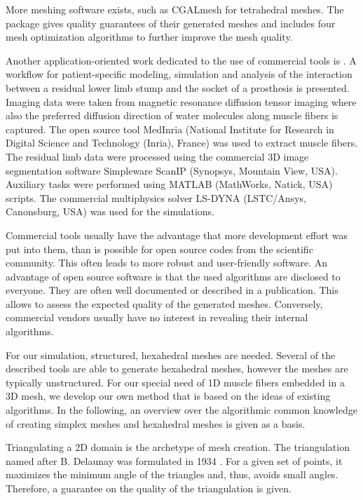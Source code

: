 More meshing software exists, such as CGALmesh \cite{Jamin2015CGALmesh} for tetrahedral meshes. The package gives quality guarantees of their generated meshes and includes four mesh optimization algorithms to further improve the mesh quality.

Another application-oriented work dedicated to the use of commercial tools is \cite{Ellankavi2018}. A workflow for patient-specific modeling, simulation and analysis of the interaction between a residual lower limb stump and the socket of a prosthesis is presented. Imaging data were taken from magnetic resonance diffusion tensor imaging where also the preferred diffusion direction of water molecules along muscle fibers is captured. The open source tool MedInria (National Institute for Research in Digital Science and Technology (Inria), France) \cite{vichot2012cardiac} was used to extract muscle fibers. The residual limb data were processed using the commercial 3D image segmentation software Simpleware ScanIP (Synopsys, Mountain View, USA). Auxiliary tasks were performed using MATLAB (MathWorks,	Natick, USA) scripts. The commercial multiphysics solver LS-DYNA (LSTC/Ansys, Canonsburg, USA) was used for the simulations.

Commercial tools usually have the advantage that more development effort was put into them, than is possible for open source codes from the scientific community. This often leads to more robust and user-friendly software. An advantage of open source software is that the used algorithms are disclosed to everyone. They are often well documented or described in a publication. This allows to assess the expected quality of the generated meshes. Conversely, commercial vendors usually have no interest in revealing their internal algorithms.

For our simulation, structured, hexahedral meshes are needed. Several of the described tools are able to generate hexahedral meshes, however the meshes are typically unstructured. For our special need of 1D muscle fibers embedded in a 3D mesh, we develop our own method that is based on the ideas of existing algorithms. In the following, an overview over the algorithmic common knowledge of creating simplex meshes and hexahedral meshes is given as a basis.

Triangulating a 2D domain is the archetype of mesh creation. The triangulation named after B. Delaunay was formulated in 1934 \cite{delaunay1934sphere}. For a given set of points, it maximizes the minimum angle of the triangles and, thus, avoids small angles. Therefore, a guarantee on the quality of the triangulation is given.

